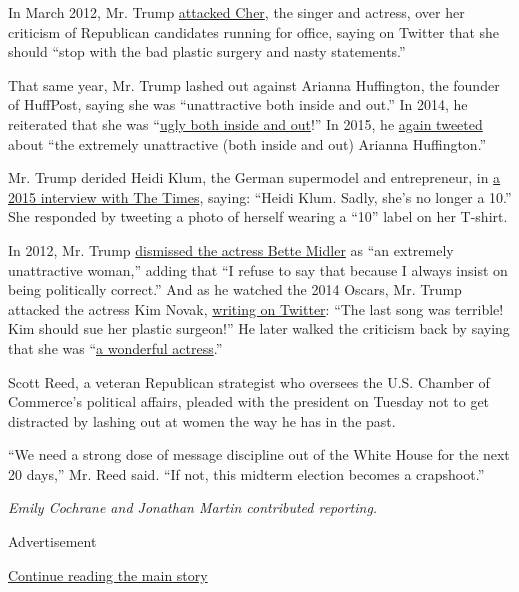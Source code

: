 In March 2012, Mr. Trump
\href{https://twitter.com/realDonaldTrump/status/201044011954348032}{attacked
Cher}, the singer and actress, over her criticism of Republican
candidates running for office, saying on Twitter that she should ``stop
with the bad plastic surgery and nasty statements.''

That same year, Mr. Trump lashed out against Arianna Huffington, the
founder of HuffPost, saying she was ``unattractive both inside and
out.'' In 2014, he reiterated that she was
``\href{https://twitter.com/realdonaldtrump/status/458031670164459521?lang=en}{ugly
both inside and out}!'' In 2015, he
\href{https://twitter.com/realDonaldTrump/status/585262729511972864}{again
tweeted} about ``the extremely unattractive (both inside and out)
Arianna Huffington.''

Mr. Trump derided Heidi Klum, the German supermodel and entrepreneur, in
\href{https://www.nytimes3xbfgragh.onion/2015/08/16/opinion/sunday/introducing-donald-trump-diplomat.html?_r=0}{a
2015 interview with The Times}, saying: ``Heidi Klum. Sadly, she's no
longer a 10.'' She responded by tweeting a photo of herself wearing a
``10'' label on her T-shirt.

In 2012, Mr. Trump
\href{https://twitter.com/realDonaldTrump/status/262584296081068033}{dismissed
the actress Bette Midler} as ``an extremely unattractive woman,'' adding
that ``I refuse to say that because I always insist on being politically
correct.'' And as he watched the 2014 Oscars, Mr. Trump attacked the
actress Kim Novak,
\href{https://twitter.com/realdonaldtrump/status/440313189062823937?lang=en}{writing
on Twitter}: ``The last song was terrible! Kim should sue her plastic
surgeon!'' He later walked the criticism back by saying that she was
``\href{https://twitter.com/realdonaldtrump/status/457208802027507712?lang=en}{a
wonderful actress}.''

Scott Reed, a veteran Republican strategist who oversees the U.S.
Chamber of Commerce's political affairs, pleaded with the president on
Tuesday not to get distracted by lashing out at women the way he has in
the past.

``We need a strong dose of message discipline out of the White House for
the next 20 days,'' Mr. Reed said. ``If not, this midterm election
becomes a crapshoot.''

\emph{Emily Cochrane and Jonathan Martin contributed reporting.}

Advertisement

\protect\hyperlink{after-bottom}{Continue reading the main story}

